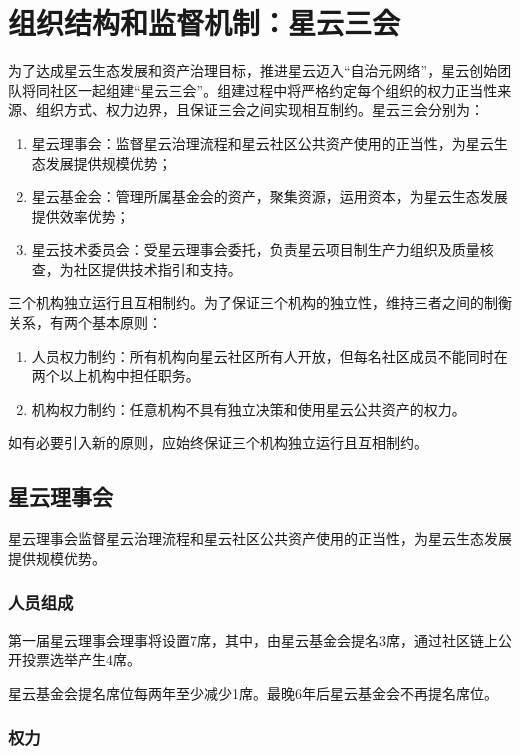 \section{组织结构和监督机制：星云三会}

为了达成星云生态发展和资产治理目标，推进星云迈入“自治元网络”，星云创始团队将同社区一起组建“星云三会”。组建过程中将严格约定每个组织的权力正当性来源、组织方式、权力边界，且保证三会之间实现相互制约。星云三会分别为：

\begin{enumerate}
	\item 星云理事会：监督星云治理流程和星云社区公共资产使用的正当性，为星云生态发展提供规模优势；
	\item 星云基金会：管理所属基金会的资产，聚集资源，运用资本，为星云生态发展提供效率优势；
	\item 星云技术委员会：受星云理事会委托，负责星云项目制生产力组织及质量核查，为社区提供技术指引和支持。
\end{enumerate}

三个机构独立运行且互相制约。为了保证三个机构的独立性，维持三者之间的制衡关系，有两个基本原则：

\begin{enumerate}
	\item 人员权力制约：所有机构向星云社区所有人开放，但每名社区成员不能同时在两个以上机构中担任职务。
	\item 机构权力制约：任意机构不具有独立决策和使用星云公共资产的权力。
\end{enumerate}

如有必要引入新的原则，应始终保证三个机构独立运行且互相制约。

\subsection{星云理事会}

星云理事会监督星云治理流程和星云社区公共资产使用的正当性，为星云生态发展提供规模优势。

\subsubsection{人员组成}

第一届星云理事会理事将设置7席，其中，由星云基金会提名3席，通过社区链上公开投票选举产生4席。

星云基金会提名席位每两年至少减少1席。最晚6年后星云基金会不再提名席位。

\subsubsection{权力}

